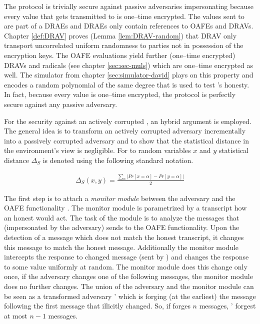 The protocol is trivially secure against passive adversaries impersonating
\JWpTwo{} because every value that gets transmitted to \JWpTwo{} is one--time
encrypted. The values sent to \JWpTwo{} are part of a DRAEs and DRAEs only
contain references to OAFEs and DRAVs. Chapter \ref{def:DRAV} proves (Lemma
\ref{lem:DRAV-random}) that DRAV only transport uncorrelated uniform randomness
to parties not in possession of the encryption keys. The OAFE evaluations yield
further (one--time encrypted) DRAVs and radicals (see chapter
\ref{sec:sec-muls}) which are one--time encrypted as well. The simulator from
chapter \ref{sec:simulator-david} plays on this property and encodes a random
polynomial of the same degree that is used to test \JWpTwo{}'s honesty. In fact,
because every value is one--time encrypted, the protocol is perfectly secure
against any passive adversary.

For the security against an actively corrupted \JWpTwo{}, an hybrid argument is
employed. The general idea is to transform an actively corrupted adversary
incrementally into a passively corrupted adversary and to show that the
statistical distance in the environment's view is negligible. For to random
variables $x$ and $y$ statistical distance $\Delta_S$ is denoted using the
following standard notation.

\begin{align*}
  \Delta_S(x,y) = \frac{\sum_\alpha \left|Pr[x=\alpha] - Pr[y=\alpha]\right|}{2}
\end{align*}

\noindent{}The first step is to attach a \emph{monitor module} between the
adversary \JWadv{} and the OAFE functionality \JWfuncSymOAFE{}. The monitor
module is parametrized by a transcript how an honest \JWpTwo{} would act. The
task of the module is to analyze the messages that \JWpTwo{} (impersonated by
the adversary) sends to the OAFE functionality. Upon the detection of a message
which does not match the honest transcript, it changes this message to match the
honest message. Additionally the monitor module intercepts the response to
changed message (sent by \JWfuncSymOAFE{}) and changes the response to some
value uniformly at random. The monitor module does this change only once, if the
adversary changes one of the following messages, the monitor module does no
further changes. The union of the adversary \JWadv{} and the
monitor module can be seen as a transformed adversary \JWadv{}' which is forging
(at the earliest) the message following the first message that \JWadv{}
illicitly changed. So, if \JWadv{} forges $n$ messages, \JWadv{}' forgest at
most $n-1$ messages.

